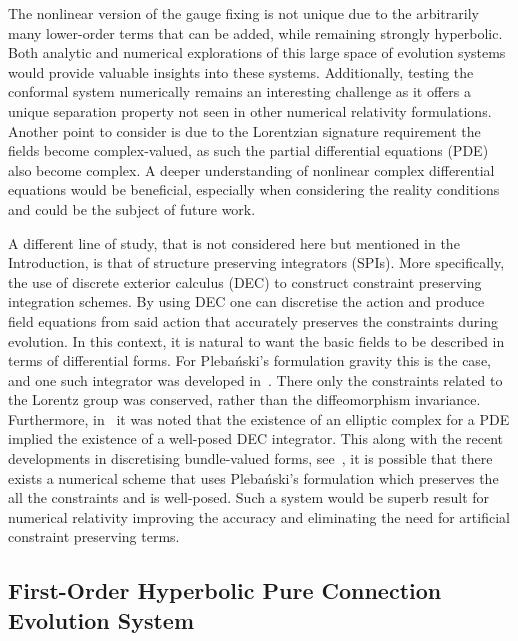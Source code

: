 \documentclass[10pt]{report}
\newcommand{\pleb}[0]{Pleba\'nski}
\theoremstyle{definition}
\begin{document}
    The nonlinear version of the gauge fixing is not unique due to the arbitrarily many lower-order terms that can be added, while remaining strongly hyperbolic. Both analytic and numerical explorations of this large space of evolution systems would provide valuable insights into these systems. Additionally, testing the conformal system numerically remains an interesting challenge as it offers a unique separation property not seen in other numerical relativity formulations. Another point to consider is due to the Lorentzian signature requirement the fields become complex-valued, as such the partial differential equations (PDE) also become complex. A deeper understanding of nonlinear complex differential equations would be beneficial, especially when considering the reality conditions and could be the subject of future work.
    
    A different line of study, that is not considered here but mentioned in the Introduction, is that of structure preserving integrators (SPIs). More specifically, the use of discrete exterior calculus (DEC) to construct constraint preserving integration schemes. By using DEC one can discretise the action and produce field equations from said action that accurately preserves the constraints during evolution. In this context, it is natural to want the basic fields to be described in terms of differential forms. For \pleb{}'s formulation gravity this is the case, and one such integrator was developed in~\cite{NumericalRelatFarr2010}. There only the constraints related to the Lorentz group was conserved, rather than the diffeomorphism invariance. Furthermore, in~\cite{Finite_element_Arnold_2009} it was noted that the existence of an elliptic complex for a PDE implied the existence of a well-posed DEC integrator. This along with the recent developments in discretising bundle-valued forms, see~\cite{braune2025discreteexteriorcalculusbundlevalued}, it is possible that there exists a numerical scheme that uses \pleb{}'s formulation which preserves the all the constraints and is well-posed. Such a system would be superb result for numerical relativity improving the accuracy and eliminating the need for artificial constraint preserving terms.

    \subsection{First-Order Hyperbolic Pure Connection Evolution System}
    
\end{document}
